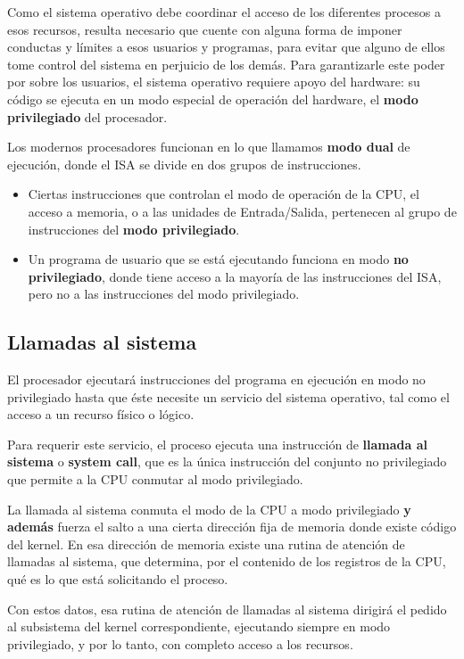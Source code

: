 \documentclass[spanish,a4paper,]{article}
\providecommand{\tightlist}{%
  \setlength{\itemsep}{0pt}\setlength{\parskip}{0pt}}
\begin{document}
Como el sistema operativo debe coordinar el acceso de los diferentes
procesos a esos recursos, resulta necesario que cuente con alguna forma
de imponer conductas y límites a esos usuarios y programas, para evitar
que alguno de ellos tome control del sistema en perjuicio de los demás.
Para garantizarle este poder por sobre los usuarios, el sistema
operativo requiere apoyo del hardware: su código se ejecuta en un modo
especial de operación del hardware, el \textbf{modo privilegiado} del
procesador.

Los modernos procesadores funcionan en lo que llamamos \textbf{modo
dual} de ejecución, donde el ISA se divide en dos grupos de
instrucciones.

\begin{itemize}
\tightlist
\item
  Ciertas instrucciones que controlan el modo de operación de la CPU, el
  acceso a memoria, o a las unidades de Entrada/Salida, pertenecen al
  grupo de instrucciones del \textbf{modo privilegiado}.
\item
  Un programa de usuario que se está ejecutando funciona en modo
  \textbf{no privilegiado}, donde tiene acceso a la mayoría de las
  instrucciones del ISA, pero no a las instrucciones del modo
  privilegiado.
\end{itemize}

\hypertarget{llamadas-al-sistema}{%
\subsection{Llamadas al sistema}\label{llamadas-al-sistema}}

El procesador ejecutará instrucciones del programa en ejecución en modo
no privilegiado hasta que éste necesite un servicio del sistema
operativo, tal como el acceso a un recurso físico o lógico.

Para requerir este servicio, el proceso ejecuta una instrucción de
\textbf{llamada al sistema} o \textbf{system call}, que es la única
instrucción del conjunto no privilegiado que permite a la CPU conmutar
al modo privilegiado.

La llamada al sistema conmuta el modo de la CPU a modo privilegiado
\textbf{y además} fuerza el salto a una cierta dirección fija de memoria
donde existe código del kernel. En esa dirección de memoria existe una
rutina de atención de llamadas al sistema, que determina, por el
contenido de los registros de la CPU, qué es lo que está solicitando el
proceso.

Con estos datos, esa rutina de atención de llamadas al sistema dirigirá
el pedido al subsistema del kernel correspondiente, ejecutando siempre
en modo privilegiado, y por lo tanto, con completo acceso a los
recursos.
\end{document}
